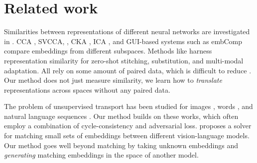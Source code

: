 \section{Related work}





Similarities between representations of
different neural networks are investigated in \citep{laakso2000content, li2016convergentlearningdifferentneural, wang2018understandinglearningrepresentationsextent, bansal2021revisitingmodelstitchingcompare, huh2024platonicrepresentationhypothesis}. CCA \citep{morcos2018insightsrepresentationalsimilarityneural}, SVCCA, \citep{raghu2017svccasingularvectorcanonical}, CKA \citep{kornblith2019similarity}, ICA \citep{yamagiwa2023discoveringuniversalgeometryembeddings}, and GUI-based systems such as embComp \citep{heimerl2019embComp} compare embeddings from different subspaces.  
Methods like \citep{maiorca2024latentspacetranslationsemantic, moschella2023relativerepresentationsenablezeroshot, moayeri2023texttoconceptandbackcrossmodel, norelli2023asifcoupleddataturns} harness representation similarity for zero-shot stitching, substitution, and multi-modal adaptation.  All rely on some amount of paired data, which is difficult  
to reduce \citep{cannistraci2023bootstrappingparallelanchorsrelative}.  Our method does not just measure similarity, we learn how to \emph{translate} representations across spaces without any paired data.



  The problem of unsupervised transport has been studied for images \citep{huang2018multimodalunsupervisedimagetoimagetranslation, liu2018unsupervisedimagetoimagetranslationnetworks,zhu2020unpairedimagetoimagetranslationusing}, words \citep{xing2015normalized, conneau2018wordtranslationparalleldata, grave2018unsupervisedalignmentembeddingswasserstein, chen2018unsupervisedmultilingualwordembeddings}, and natural language sequences \citep{raviknight2011deciphering, lample2018unsupervisedmachinetranslationusing, alvarezmelis2018gromovwassersteinalignmentwordembedding, artetxe2018unsupervisedneuralmachinetranslation, yang2018unsupervisedneuralmachinetranslation}. Our method builds on these works, which often employ a combination of cycle-consistency and adversarial loss. \citep{schnaus2025itsblindmatchvisionlanguage} proposes a solver for matching small sets of embeddings between different vision-language models.  Our method goes well beyond matching by taking unknown embeddings and \emph{generating} matching embeddings in the space of another model.

